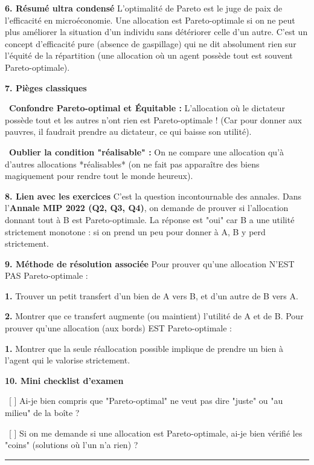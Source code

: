 \documentclass[11pt, a4paper]{report}
\begin{document}
\textbf{6. Résumé ultra condensé}
L'optimalité de Pareto est le juge de paix de l'efficacité en microéconomie. Une allocation est Pareto-optimale si on ne peut plus améliorer la situation d'un individu sans détériorer celle d'un autre. C'est un concept d'efficacité pure (absence de gaspillage) qui ne dit absolument rien sur l'équité de la répartition (une allocation où un agent possède tout est souvent Pareto-optimale).

\textbf{7. Pièges classiques}
\par \textbullet\ \textbf{Confondre Pareto-optimal et Équitable :} L'allocation où le dictateur possède tout et les autres n'ont rien est Pareto-optimale ! (Car pour donner aux pauvres, il faudrait prendre au dictateur, ce qui baisse son utilité).
\par \textbullet\ \textbf{Oublier la condition "réalisable" :} On ne compare une allocation qu'à d'autres allocations *réalisables* (on ne fait pas apparaître des biens magiquement pour rendre tout le monde heureux).

\textbf{8. Lien avec les exercices}
C'est la question incontournable des annales. Dans l'\textbf{Annale MIP 2022 (Q2, Q3, Q4)}, on demande de prouver si l'allocation donnant tout à B est Pareto-optimale. La réponse est "oui" car B a une utilité strictement monotone : si on prend un peu pour donner à A, B y perd strictement.

\textbf{9. Méthode de résolution associée}
Pour prouver qu'une allocation N'EST PAS Pareto-optimale :
\par \textbf{1.} Trouver un petit transfert d'un bien de A vers B, et d'un autre de B vers A.
\par \textbf{2.} Montrer que ce transfert augmente (ou maintient) l'utilité de A et de B.
Pour prouver qu'une allocation (aux bords) EST Pareto-optimale :
\par \textbf{1.} Montrer que la seule réallocation possible implique de prendre un bien à l'agent qui le valorise strictement.

\textbf{10. Mini checklist d’examen}
\par \textbullet\ [ ] Ai-je bien compris que "Pareto-optimal" ne veut pas dire "juste" ou "au milieu" de la boîte ?
\par \textbullet\ [ ] Si on me demande si une allocation est Pareto-optimale, ai-je bien vérifié les "coins" (solutions où l'un n'a rien) ?

\vspace{1cm}\hrule\vspace{1cm}
\end{document}
